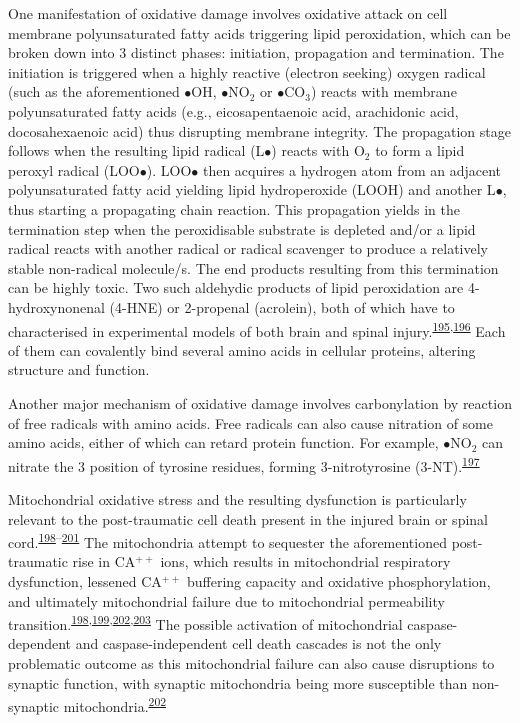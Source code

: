 \documentclass[
]{article}
\begin{document}
One manifestation of oxidative damage involves oxidative attack on cell membrane polyunsaturated fatty acids triggering lipid peroxidation, which can be broken down into 3 distinct phases: initiation, propagation and termination.
The initiation is triggered when a highly reactive (electron seeking) oxygen radical (such as the aforementioned \(\bullet\)OH, \(\bullet\)NO\(_2\) or \(\bullet\)CO\(_3\)) reacts with membrane polyunsaturated fatty acids (e.g., eicosapentaenoic acid, arachidonic acid, docosahexaenoic acid) thus disrupting membrane integrity.
The propagation stage follows when the resulting lipid radical (L\(\bullet\)) reacts with O\(_2\) to form a lipid peroxyl radical (LOO\(\bullet\)).
LOO\(\bullet\) then acquires a hydrogen atom from an adjacent polyunsaturated fatty acid yielding lipid hydroperoxide (LOOH) and another L\(\bullet\), thus starting a propagating chain reaction.
This propagation yields in the termination step when the peroxidisable substrate is depleted and/or a lipid radical reacts with another radical or radical scavenger to produce a relatively stable non-radical molecule/s.
The end products resulting from this termination can be highly toxic.
Two such aldehydic products of lipid peroxidation are 4-hydroxynonenal (4-HNE) or 2-propenal (acrolein), both of which have to characterised in experimental models of both brain and spinal injury.\textsuperscript{\protect\hyperlink{ref-bains_antioxidant_2012}{195},\protect\hyperlink{ref-hamann_acrolein_2009}{196}}
Each of them can covalently bind several amino acids in cellular proteins, altering structure and function.

Another major mechanism of oxidative damage involves carbonylation by reaction of free radicals with amino acids.
Free radicals can also cause nitration of some amino acids, either of which can retard protein function.
For example, \(\bullet\)NO\(_2\) can nitrate the 3 position of tyrosine residues, forming 3-nitrotyrosine (3-NT).\textsuperscript{\protect\hyperlink{ref-mustafa_mitochondrial_2010}{197}}

Mitochondrial oxidative stress and the resulting dysfunction is particularly relevant to the post-traumatic cell death present in the injured brain or spinal cord.\textsuperscript{\protect\hyperlink{ref-lifshitz_structural_2003}{198}--\protect\hyperlink{ref-sullivan_temporal_2007}{201}}
The mitochondria attempt to sequester the aforementioned post-traumatic rise in CA\(^{++}\) ions, which results in mitochondrial respiratory dysfunction, lessened CA\(^{++}\) buffering capacity and oxidative phosphorylation, and ultimately mitochondrial failure due to mitochondrial permeability transition.\textsuperscript{\protect\hyperlink{ref-lifshitz_structural_2003}{198},\protect\hyperlink{ref-singh_time_2006}{199},\protect\hyperlink{ref-sullivan_traumatic_1998}{202},\protect\hyperlink{ref-sullivan_mitochondrial_2005}{203}}
The possible activation of mitochondrial caspase-dependent and caspase-independent cell death cascades is not the only problematic outcome as this mitochondrial failure can also cause disruptions to synaptic function, with synaptic mitochondria being more susceptible than non-synaptic mitochondria.\textsuperscript{\protect\hyperlink{ref-sullivan_traumatic_1998}{202}}
\end{document}

